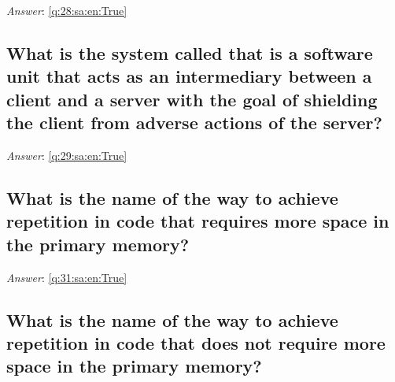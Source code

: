 \documentclass[a4paper,11pt,oneside]{article}
\begin{document}
\begin{sloppypar}
\label{q:28:sa:en:False}

\vspace{2cm}

\noindent\makebox[\textwidth]{\hrulefill}

\vspace{1cm}

\textit{Answer}: \autoref{q:28:sa:en:True}



\subsection{What is the system called that is a software unit that acts as an intermediary between a client and a server with the goal of shielding the client from adverse actions of the server?}

\label{q:29:sa:en:False}

\vspace{2cm}

\noindent\makebox[\textwidth]{\hrulefill}

\vspace{1cm}

\textit{Answer}: \autoref{q:29:sa:en:True}



\subsection{What is the name of the way to achieve repetition in code that requires more space in the primary memory?}

\label{q:31:sa:en:False}

\vspace{2cm}

\noindent\makebox[\textwidth]{\hrulefill}

\vspace{1cm}

\textit{Answer}: \autoref{q:31:sa:en:True}



\subsection{What is the name of the way to achieve repetition in code that does not require more space in the primary memory?}

\label{q:32:sa:en:False}

\vspace{2cm}

\noindent\makebox[\textwidth]{\hrulefill}


\end{sloppypar}
\end{document}
